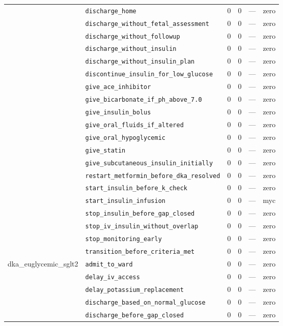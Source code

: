 \begin{table}[ht]
\begin{tabular}{llrrrl}
 & \texttt{discharge\_home} & 0 & 0 & — & zero \\
 & \texttt{discharge\_without\_fetal\_assessment} & 0 & 0 & — & zero \\
 & \texttt{discharge\_without\_followup} & 0 & 0 & — & zero \\
 & \texttt{discharge\_without\_insulin} & 0 & 0 & — & zero \\
 & \texttt{discharge\_without\_insulin\_plan} & 0 & 0 & — & zero \\
 & \texttt{discontinue\_insulin\_for\_low\_glucose} & 0 & 0 & — & zero \\
 & \texttt{give\_ace\_inhibitor} & 0 & 0 & — & zero \\
 & \texttt{give\_bicarbonate\_if\_ph\_above\_7.0} & 0 & 0 & — & zero \\
 & \texttt{give\_insulin\_bolus} & 0 & 0 & — & zero \\
 & \texttt{give\_oral\_fluids\_if\_altered} & 0 & 0 & — & zero \\
 & \texttt{give\_oral\_hypoglycemic} & 0 & 0 & — & zero \\
 & \texttt{give\_statin} & 0 & 0 & — & zero \\
 & \texttt{give\_subcutaneous\_insulin\_initially} & 0 & 0 & — & zero \\
 & \texttt{restart\_metformin\_before\_dka\_resolved} & 0 & 0 & — & zero \\
 & \texttt{start\_insulin\_before\_k\_check} & 0 & 0 & — & zero \\
 & \texttt{start\_insulin\_infusion} & 0 & 0 & — & myc \\
 & \texttt{stop\_insulin\_before\_gap\_closed} & 0 & 0 & — & zero \\
 & \texttt{stop\_iv\_insulin\_without\_overlap} & 0 & 0 & — & zero \\
 & \texttt{stop\_monitoring\_early} & 0 & 0 & — & zero \\
 & \texttt{transition\_before\_criteria\_met} & 0 & 0 & — & zero \\
\midrule
dka\_euglycemic\_sglt2 & \texttt{admit\_to\_ward} & 0 & 0 & — & zero \\
 & \texttt{delay\_iv\_access} & 0 & 0 & — & zero \\
 & \texttt{delay\_potassium\_replacement} & 0 & 0 & — & zero \\
 & \texttt{discharge\_based\_on\_normal\_glucose} & 0 & 0 & — & zero \\
 & \texttt{discharge\_before\_gap\_closed} & 0 & 0 & — & zero \\

\end{tabular}
\end{table}
